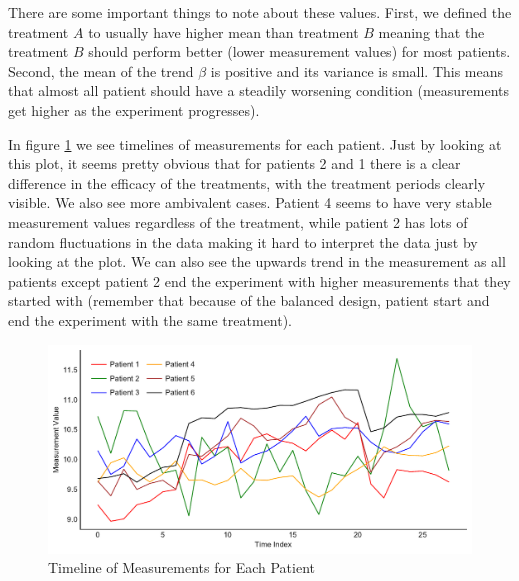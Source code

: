 \documentclass[12pt,a4paper,leqno]{report}
\theoremstyle{plain}
\theoremstyle{definition}
\theoremstyle{remark}
\begin{document}
There are some important things to note about these values. First, we defined the
treatment \(A\) to usually have higher mean than treatment \(B\) meaning that the
treatment \(B\) should perform better (lower measurement values) for most patients.
Second, the mean of the trend \(\beta \) is positive and its variance is small. This means
that almost all patient should have a steadily worsening condition (measurements get
higher as the experiment progresses).

In figure \ref{measurementtimeline} we see timelines of measurements for each patient. Just by looking at this plot, it seems
pretty obvious that for patients 2 and 1 there is a clear difference in the efficacy of the
treatments, with the treatment periods clearly visible. We also see more ambivalent
cases. Patient 4 seems to have very stable measurement values regardless of the
treatment, while patient 2 has lots of random fluctuations in the data making it hard to
interpret the data just by looking at the plot. We can also see the upwards trend in the
measurement as all patients except patient 2 end the experiment with higher measurements
that they started with (remember that because of the balanced design, patient start and
end the experiment with the same treatment).

\begin{figure}[H]
    \label{measurementtimeline}
    \caption{Timeline of Measurements for Each Patient}
    \includegraphics[width=\textwidth,height=\textheight,keepaspectratio]{measurements_timeline.pdf}
\end{figure}
\end{document}
